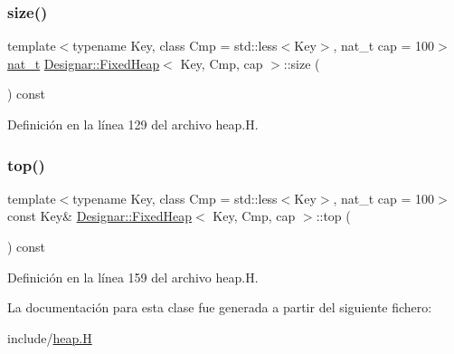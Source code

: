 \subsubsection{\texorpdfstring{size()}{size()}}
{\footnotesize\ttfamily template$<$typename Key, class Cmp = std\+::less$<$\+Key$>$, nat\+\_\+t cap = 100$>$ \\
\hyperlink{namespace_designar_aa72662848b9f4815e7bf31a7cf3e33d1}{nat\+\_\+t} \hyperlink{class_designar_1_1_fixed_heap}{Designar\+::\+Fixed\+Heap}$<$ Key, Cmp, cap $>$\+::size (\begin{DoxyParamCaption}{ }\end{DoxyParamCaption}) const\hspace{0.3cm}{\ttfamily [inline]}}



Definición en la línea 129 del archivo heap.\+H.

\mbox{\label{class_designar_1_1_fixed_heap_a2b48592e01a0b8836a18415219a310ca}} 
\subsubsection{\texorpdfstring{top()}{top()}}
{\footnotesize\ttfamily template$<$typename Key, class Cmp = std\+::less$<$\+Key$>$, nat\+\_\+t cap = 100$>$ \\
const Key\& \hyperlink{class_designar_1_1_fixed_heap}{Designar\+::\+Fixed\+Heap}$<$ Key, Cmp, cap $>$\+::top (\begin{DoxyParamCaption}{ }\end{DoxyParamCaption}) const\hspace{0.3cm}{\ttfamily [inline]}}



Definición en la línea 159 del archivo heap.\+H.



La documentación para esta clase fue generada a partir del siguiente fichero\+:\begin{DoxyCompactItemize}
\item 
include/\hyperlink{heap_8_h}{heap.\+H}\end{DoxyCompactItemize}
